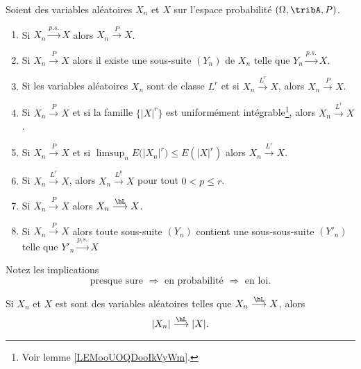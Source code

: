\begin{theorem}	\label{THOooMXFMooVHdSFE}
	Soient des variables aléatoires \( X_n\) et \( X\) sur l'espace probabilité \( (\Omega,\tribA,P)\).
	\begin{enumerate}
		\item
		      Si \( X_n\stackrel{ p.s.}{\longrightarrow} X\) alors \( X_n\stackrel{ P}{\longrightarrow} X\).
		\item		\label{ITEMooRPLIooHcFLCR}
		      Si \( X_n\stackrel{ P}{\longrightarrow} X\) alors il existe une sous-suite \( (Y_n) \) de \( X_n\) telle que \( Y_n\stackrel{ p.s.}{\longrightarrow} X\).
		\item
		      Si les variables aléatoires \( X_n\) sont de classe \( L^r\) et si \( X_n\stackrel{ L^r}{\longrightarrow} X\), alors \( X_n\stackrel{ P}{\longrightarrow} X\).
		\item	\label{ITEMooAYRCooCYLpWX}
		      Si \( X_n\stackrel{ P}{\longrightarrow} X\) et si la famille \( \{ | X |^r \}\) est uniformément intégrable\footnote{Voir lemme \ref{LEMooUOQDooIkVyWm}.}, alors \( X_n\stackrel{ L^r}{\longrightarrow} X\).
		\item
		      Si \( X_n\stackrel{ P}{\longrightarrow} X\) et si \( \limsup_{n}E\big( | X_n |^r \big)\leq E(| X |^r)\) alors \( X_n\stackrel{ L^r}{\longrightarrow} X\).
		\item
		      Si \( X_n\stackrel{ L^r}{\longrightarrow} X\), alors \( X_n\stackrel{ L^p}{\longrightarrow} X\) pour tout \( 0<p\leq r\).
		\item		\label{ITEMooPRGRooUqNKjB}
		      Si \( X_n\stackrel{ P}{\longrightarrow} X\) alors \( X_n\stackrel{ \hL}{\longrightarrow} X\).
		\item
		      Si \( X_n\stackrel{ P}{\longrightarrow} X\) alors toute sous-suite \( (Y_n)\) contient une sous-sous-suite \( (Y'_n)\) telle que \( Y'_n\stackrel{ p.s.}{\longrightarrow} X\)
	\end{enumerate}
	Notez les implications
	\begin{equation}
		\text{presque sure }\Rightarrow\text{ en probabilité }\Rightarrow\text{ en loi}.
	\end{equation}
\end{theorem}


\begin{proposition}	\label{PROPooXRVOooEYQzGr}
	Si \( X_n\) et \(  X \) est sont des variables aléatoires telles que \( X_n\stackrel{ \hL}{\longrightarrow} X\), alors
	\begin{equation}
		| X_n |\stackrel{ \hL}{\longrightarrow} | X |.
	\end{equation}
\end{proposition}


